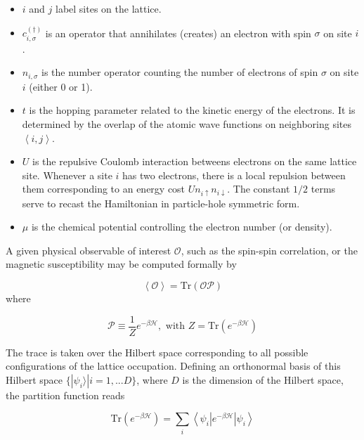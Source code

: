 \documentclass[10pt, twocolumn, twoside]{article}
\begin{document}
\begin{itemize}
\item $i$ and $j$ label sites on the lattice.
\item $c_{i,\sigma}^{(\dagger)}$ is an operator that annihilates (creates) an electron with spin $\sigma$ on site $i$.
\item $n_{i,\sigma}$ is the number operator counting the number of electrons of spin $\sigma$ on site $i$ (either 0 or 1).
\item $t$ is the hopping parameter related to the kinetic energy of the electrons. It is determined by the overlap of the atomic wave functions on neighboring sites $\left\langle i, j \right\rangle$.
\item $U$ is the repulsive Coulomb interaction betweens electrons on the same lattice site. Whenever a site $i$ has two electrons, there is a local repulsion between them corresponding to an energy cost $U n_{i \uparrow} n_{i \downarrow}$. The constant $1/2$ terms serve to recast the Hamiltonian in particle-hole symmetric form.
\item $\mu$ is the chemical potential controlling the electron number (or density).
\end{itemize}

A given physical observable of interest $\mathcal{O}$, such as the spin-spin correlation, or the magnetic susceptibility may be computed formally by

\begin{equation}
\left\langle \mathcal{O} \right\rangle = \text{Tr} ( \mathcal{O} \mathcal{P} )
\end{equation}
where

\begin{equation}\label{eq:projection}
\mathcal{P} \equiv \frac{1}{Z} e^{-\beta \mathcal{H} } , \text{ with } Z = \text{Tr} ( e^{-\beta \mathcal{H} } )
\end{equation}

The trace is taken over the Hilbert space corresponding to all possible configurations of the lattice occupation. Defining an orthonormal basis of this Hilbert space $\{ | \psi_i \rangle | i = 1, ... D \} $, where $D$ is the dimension of the Hilbert space, the partition function reads

\begin{equation}\label{eq:z_asEigen}
\text{Tr} ( e^{-\beta \mathcal{H} } )= \sum_i \left\langle \psi_i | e^{-\beta \mathcal{H} } | \psi_i \right\rangle
\end{equation}
\end{document}
